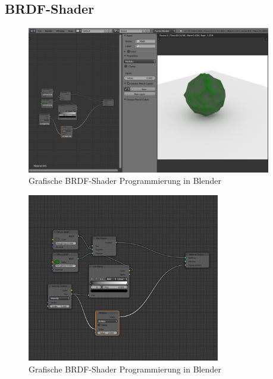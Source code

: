 \subsection{BRDF-Shader}
 \begin{figure}[H]
    \centering
    \includegraphics[width=0.95\textwidth]{images/blender_noodle.png}
    \caption{Grafische BRDF-Shader Programmierung in Blender}
    \label{fig:diffus}
\end{figure}
 \begin{figure}[H]
    \centering
    \includegraphics[width=0.75\textwidth]{images/blender_noodle2.png}
    \caption{Grafische BRDF-Shader Programmierung in Blender}
    \label{fig:diffus}
\end{figure}

